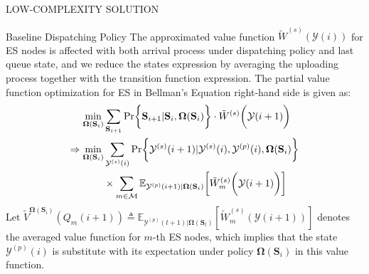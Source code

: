 \documentclass[10pt, conference, letterpaper]{IEEEtran}
\newcommand{\define}{\triangleq}
\newcommand{\leadto}{\Rightarrow}
\renewcommand{\vec}{\mathbf}
\DeclarePairedDelimiter{\set}{\{}{\}}
\DeclarePairedDelimiter{\Paren}{\bigg(}{\bigg)}
\DeclarePairedDelimiter{\Bracket}{\bigg[}{\bigg]}
\DeclarePairedDelimiter{\Brace}{\bigg\{}{\bigg\}}
\newcommand{\apSet}{\mathcal{K}}
\newcommand{\esSet}{\mathcal{M}}
\newcommand{\Stat}{\mathbf{S}}
\newcommand{\Obsv}{\mathcal{Y}}
\newcommand{\Policy}{\mathbf{\Omega}}
\begin{document}
\begin{section}{LOW-COMPLEXITY SOLUTION}
\begin{subsection}{Baseline Dispatching Policy}
            The approximated value function $\tilde{W}^{(s)}(\Obsv(i))$ for ES nodes is affected with both arrival process under dispatching policy and last queue state, and we reduce the states expression by averaging the uploading process together with the transition function expression.
            The partial value function optimization for ES in Bellman's Equation right-hand side is given as:
            \begin{align}
                \min_{\Policy(\Stat_i)}& \sum_{\Stat_{i+1}}
                    \Pr\Brace{\Stat_{i+1}|\Stat_{i}, \Policy(\Stat_i)} \cdot \tilde{W}^{(s)}\Paren{\Obsv(i+1)}
                \nonumber\\
                \leadto \min_{\Policy(\Stat_i)}& \sum_{\Obsv^{(s)}(i)}
                    \Pr\Brace{\Obsv^{(s)}(i+1)|\Obsv^{(s)}(i), \Obsv^{(p)}(i), \Policy(\Stat_i)}
                    \nonumber\\
                    & \times \sum_{m\in\esSet}
                        \mathbb{E}_{\Obsv^{(p)}(i+1)|\Policy(\Stat_i)}\Bracket{\tilde{W}^{(s)}_m\Paren{\Obsv(i+1)}}
            \end{align}
            Let $\tilde{V}^{\Policy(\Stat_i)}(Q_m(i+1)) \define \mathbb{E}_{\Obsv^{(p)}(t+1)|\Policy(\Stat_t)} [\tilde{W}^{(s)}_m(\Obsv(i+1))]$ denotes the averaged value function for $m$-th ES nodes, which implies that the state $\Obsv^{(p)}(i)$ is substitute with its expectation under policy $\Policy(\Stat_i)$ in this value function.


\end{subsection}
\end{section}
\end{document}
